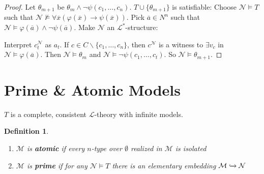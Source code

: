 \documentclass[]{article}
\theoremstyle{custhm}
\theoremstyle{cusdef}
\newtheorem{defin}[theorem]{Definition}
\theoremstyle{custhm}
\theoremstyle{custhm}
\theoremstyle{custhm}
\theoremstyle{ex}
\theoremstyle{custhm}
\theoremstyle{cusdef}
\theoremstyle{remark}
\theoremstyle{remark}
\newcommand{\ra}{\rightarrow}
\newcommand{\undf}[1]{\textit{\textbf{#1}}}
\renewcommand{\L}{\mathcal{L}}
\newcommand{\M}{\mathcal{M}}
\renewcommand{\phi}{\varphi}
\renewcommand{\bar}{\overline}
\newcommand{\N}{\mathcal{N}}
\begin{document}
\begin{proof}
Let $\theta_{m+1}$ be $\theta_m\land \neg\psi(c_1,\dots,c_n)$. $T\cup\{\theta_{m+1}\}$ is satisfiable: Choose $\N\models T$ such that $\N\not\models \forall \bar{x}(\phi(\bar{x})\ra\psi(\bar{x}))$. Pick $\bar{a}\in N^n$ such that $\N\models \phi(\bar{a})\land \neg\psi(\bar{a})$. Make $\N$ an $\L^\ast$-structure:

Interpret $c_t^\N$ as $a_t$. If $c\in C\backslash\{c_1,\dots,c_n\}$, then $c^\N$ is a witness to $\exists v_c$ in $\N\models \phi(\bar{a})$. Then $\N\models \theta_m$ and $\N\models \neg\psi(c_1,\dots,c_t)$. So $\N\models \theta_{m+1}$.
\end{proof}

\section{Prime \& Atomic Models}

$T$ is a complete, consistent $\L$-theory with infinite models.

\begin{defin}\ 
\begin{enumerate}[label=\arabic*)]
	\item $\M$ is \undf{atomic} if every $n$-type over $\emptyset$ realized in $\M$ is isolated
	\item $\M$ is \undf{prime} if for any $\N\models T$ there is an elementary embedding $\M\xhookrightarrow{}\N$
\end{enumerate}
\end{defin}
\end{document}
